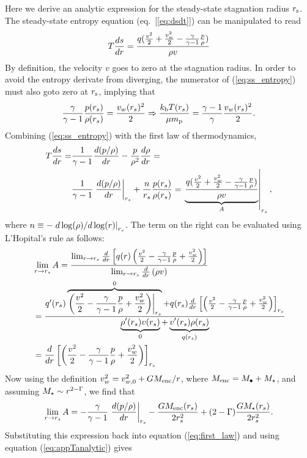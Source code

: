 
Here we derive an analytic expression for the steady-state stagnation radius $r_{\rm s}$.  The steady-state entropy equation (eq.~[\ref{eq:dsdt}]) can be manipulated to read
\begin{align}
T\frac{d s}{d r}=\frac{q (\frac{v^2}{2}+\frac{v_w^2}{2}-\frac{\gamma}{\gamma-1} \frac{p}{\rho})}{\rho v} \label{eq:ss_entropy}
\end{align}
By definition, the velocity $v$ goes to zero at the stagnation radius.  In order to avoid the entropy derivate from diverging, the numerator of (\ref{eq:ss_entropy}) must also goto zero at $r_{\rm s}$, implying that
\begin{align}
 \frac{\gamma}{\gamma-1} \frac{p(r_s)}{\rho(r_s)}=\frac{v_w(r_s)^2}{2} \Rightarrow \frac{k_{\rm b} T(r_s)}{\mu m_{\rm p}}=\frac{\gamma-1}{\gamma} \frac{v_w(r_s)^2}{2} .
\label{eq:appTanalytic}
\end{align}
Combining (\ref{eq:ss_entropy}) with the first law of thermodynamics,
\begin{align}
T\frac{d s}{d r} =& \frac{1}{\gamma-1}\frac{d (p/\rho)}{d r}-\frac{p}{\rho^2}\frac{d \rho}{d r} = \\
& 
\frac{1}{\gamma-1}\left.\frac{d (p/\rho)}{d r}\right|_{r_s}+\frac{n}{r_s}  \frac{p(r_s)}{\rho(r_s)}=\left.\underbrace{\frac{q (\frac{v^2}{2}+\frac{v_w^2}{2}-\frac{\gamma}{\gamma-1} \frac{p}{\rho})}{\rho  v}}_{A}\right|_{r_s}, 
 \label{eq:first_law}
\end{align}
where $n\equiv -\left.d\log(\rho)/d\log(r)\right|_{r_s}$.  The term on the right can be evaluated using L'Hopital's rule as follows:
\begin{align}
  &\lim_{r \rightarrow r_s} A=\frac{\lim_{r \rightarrow r_s}
    \frac{d}{dr}\left[q (r)\left(\frac{v^2}{2} -\frac{\gamma}{\gamma-1}
        \frac{p}{\rho}+\frac{v_w^2}{2}\right)\right]}{\lim_{r \rightarrow r_s}
    \frac{d}{dr} \left(\rho v\right)}\\
  &=\frac{ q'(r_s) \overbrace{\left.\left(\frac{v^2}{2}
        -\frac{\gamma}{\gamma-1}\frac{p}{\rho}+\frac{v_w^2}{2}\right)\right|_{r_s}}^0+ q(r_s)
    \frac{d}{dr} \left[\left(\frac{v^2}{2} -\frac{\gamma}{\gamma-1}
        \frac{p}{\rho}+\frac{v_w^2}{2}\right)\right]_{r_s}}{\underbrace{\rho'(r_s)
      v(r_s)}_0 +\underbrace{v'(r_s)\rho(r_s)}_{q(r_s)}}\\
  &= \frac{d}{dr} \left[\left(\frac{v^2}{2} -\frac{\gamma}{\gamma-1} \frac{p}{\rho}+\frac{v_w^2}{2}\right)\right]_{r_s}
\end{align}
Now using the definition $v_w^2=v_{w,0}^2+ G M_{\rm enc}/r$, where
$M_{\rm enc}=M_{\bullet}+M_{\star}$, and assuming $M_{\star} \sim r^{2-\Gamma}$, we find that
\begin{align}
\lim_{r \rightarrow r_s} A=-\frac{\gamma}{\gamma-1}
\left.\frac{d (p/\rho)}{d r}\right|_{r_s}-\frac{G M_{\rm enc}(r_s)}{2 r_s^2}+(2-\Gamma) \frac{G
  M_{\star}(r_s)}{2 r_s^2}.
\end{align}
Substituting this expression back into equation (\ref{eq:first_law}) and using equation (\ref{eq:appTanalytic}) gives
